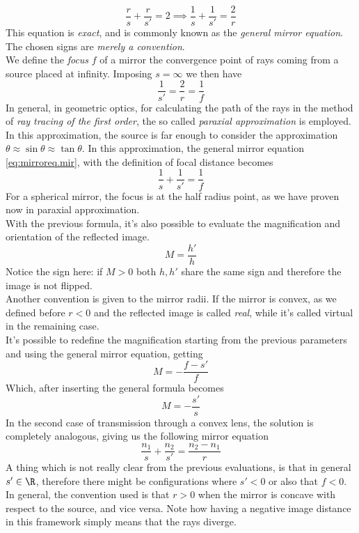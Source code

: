 \documentclass[../electromagnetism.tex]{subfiles}
\begin{document}
\begin{equation}
	\frac{r}{s}+\frac{r}{s'}=2\implies\frac{1}{s}+\frac{1}{s'}=\frac{2}{r}
	\label{eq:mirroreq.mir}
\end{equation}
This equation is \textit{exact}, and is commonly known as the \textit{general mirror equation}.
The chosen signs are \textit{merely a convention}.\\
We define the \textit{focus} $f$ of a mirror the convergence point of rays coming from a source placed at infinity. Imposing $s=\infty$ we then have
\begin{equation}
	\frac{1}{s'}=\frac{2}{r}=\frac{1}{f}
	\label{eq:focus.gop}
\end{equation}
In general, in geometric optics, for calculating the path of the rays in the method of \textit{ray tracing of the first order}, the so called \textit{paraxial approximation} is employed. In this approximation, the source is far enough to consider the approximation $\theta\approx\sin\theta\approx\tan\theta$. In this approximation, the general mirror equation \eqref{eq:mirroreq.mir}, with the definition of focal distance becomes
\begin{equation}
	\frac{1}{s}+\frac{1}{s'}=\frac{1}{f}
	\label{eq:paraxialmirr.mir}
\end{equation}
For a spherical mirror, the focus is at the half radius point, as we have proven now in paraxial approximation.\\
With the previous formula, it's also possible to evaluate the magnification and orientation of the reflected image.\\
\begin{equation}
	M=\frac{h'}{h}
	\label{eq:magnification.gop}
\end{equation}
Notice the sign here: if $M>0$ both $h, h'$ share the same sign and therefore the image is not flipped.\\
Another convention is given to the mirror radii. If the mirror is convex, as we defined before $r<0$ and the reflected image is called \textit{real}, while it's called virtual in the remaining case.\\
It's possible to redefine the magnification starting from the previous parameters and using the general mirror equation, getting
\begin{equation*}
	M=-\frac{f-s'}{f}
\end{equation*}
Which, after inserting the general formula becomes
\begin{equation}
	M=-\frac{s'}{s}
	\label{eq:generalmag.gop}
\end{equation}
In the second case of transmission through a convex lens, the solution is completely analogous, giving us the following mirror equation
\begin{equation}
	\frac{n_1}{s}+\frac{n_2}{s'}=\frac{n_2-n_1}{r}
	\label{eq:convexlens.mir}
\end{equation}
A thing which is not really clear from the previous evaluations, is that in general $s'\in\R$, therefore there might be configurations where $s'<0$ or also that $f<0$. In general, the convention used is that $r>0$ when the mirror is concave with respect to the source, and vice versa. Note how having a negative image distance in this framework simply means that the rays diverge.
\end{document}
